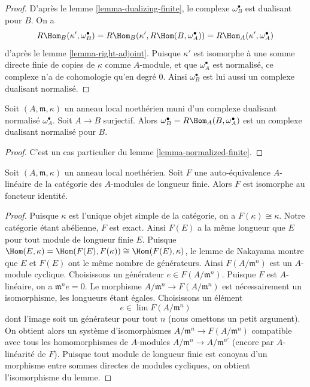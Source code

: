 \begin{proof}
D'après le lemme \ref{lemma-dualizing-finite}, le complexe $\omega_B^\bullet$ est dualisant pour $B$.
On a
$$
R\Hom_B(\kappa', \omega_B^\bullet) =
R\Hom_B(\kappa', R\Hom(B, \omega_A^\bullet)) =
R\Hom_A(\kappa', \omega_A^\bullet)
$$
d'après le lemme \ref{lemma-right-adjoint}. Puisque $\kappa'$ est isomorphe à une somme directe
finie de copies de $\kappa$ comme $A$-module, et que $\omega_A^\bullet$ est normalisé,
ce complexe n'a de cohomologie qu'en degré $0$.
Ainsi $\omega_B^\bullet$ est lui aussi un complexe dualisant normalisé.
\end{proof}

\begin{lemma}
\label{lemma-normalized-quotient}
Soit $(A, \mathfrak m, \kappa)$ un anneau local noethérien muni d'un complexe dualisant
normalisé $\omega_A^\bullet$. Soit $A \to B$ surjectif.
Alors $\omega_B^\bullet = R\Hom_A(B, \omega_A^\bullet)$ est un complexe dualisant normalisé pour $B$.
\end{lemma}

\begin{proof}
C'est un cas particulier du lemme \ref{lemma-normalized-finite}.
\end{proof}

\begin{lemma}
\label{lemma-equivalence-finite-length}
Soit $(A, \mathfrak m, \kappa)$ un anneau local noethérien. Soit $F$
une auto-équivalence $A$-linéaire de la catégorie des $A$-modules
de longueur finie. Alors $F$ est isomorphe au foncteur identité.
\end{lemma}

\begin{proof}
Puisque $\kappa$ est l'unique objet simple de la catégorie, on a $F(\kappa) \cong \kappa$.
Notre catégorie étant abélienne, $F$ est exact.
Ainsi $F(E)$ a la même longueur que $E$ pour tout module de longueur finie $E$.
Puisque $\Hom(E, \kappa) = \Hom(F(E), F(\kappa)) \cong \Hom(F(E), \kappa)$, le lemme de Nakayama montre que $E$ et $F(E)$
ont le même nombre de générateurs. Ainsi $F(A/\mathfrak m^n)$ est un $A$-module cyclique.
Choisissons un générateur $e \in F(A/\mathfrak m^n)$.
Puisque $F$ est $A$-linéaire, on a $\mathfrak m^n e = 0$.
Le morphisme $A/\mathfrak m^n \to F(A/\mathfrak m^n)$ est nécessairement un isomorphisme, les longueurs étant égales.
Choisissons un élément
$$
e \in \lim F(A/\mathfrak m^n)
$$
dont l'image soit un générateur pour tout $n$ (nous omettons un petit argument).
On obtient alors un système d'isomorphismes $A/\mathfrak m^n \to F(A/\mathfrak m^n)$
compatible avec tous les homomorphismes de $A$-modules $A/\mathfrak m^n \to A/\mathfrak m^{n'}$
(encore par $A$-linéarité de $F$).
Puisque tout module de longueur finie est conoyau d'un morphisme
entre sommes directes de modules cycliques, on obtient l'isomorphisme du lemme.
\end{proof}

